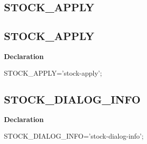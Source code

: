 \documentclass{report}
\newif\ifpdf
\begin{document}
\subsection*{\large{\textbf{STOCK{\_}APPLY}}\normalsize\hspace{1ex}\hrulefill}
\else
\subsection*{STOCK{\_}APPLY}
\fi
\label{licommon-STOCK_APPLY}
\begin{list}{}{
\setlength{\itemindent}{0cm}
\setlength{\listparindent}{0cm}
\setlength{\leftmargin}{\evensidemargin}
\addtolength{\leftmargin}{\tmplength}
\settowidth{\labelsep}{X}
\addtolength{\leftmargin}{\labelsep}
\setlength{\labelwidth}{\tmplength}
}
\item[\textbf{Declaration}\hfill]
\ifpdf
\begin{flushleft}
\fi
\begin{ttfamily}
STOCK{\_}APPLY='stock-apply';\end{ttfamily}

\ifpdf
\end{flushleft}
\fi

\end{list}
\ifpdf
\subsection*{\large{\textbf{STOCK{\_}DIALOG{\_}INFO}}\normalsize\hspace{1ex}\hrulefill}
\else
\subsection*{STOCK{\_}DIALOG{\_}INFO}
\fi
\label{licommon-STOCK_DIALOG_INFO}
\begin{list}{}{
\setlength{\itemindent}{0cm}
\setlength{\listparindent}{0cm}
\setlength{\leftmargin}{\evensidemargin}
\addtolength{\leftmargin}{\tmplength}
\settowidth{\labelsep}{X}
\addtolength{\leftmargin}{\labelsep}
\setlength{\labelwidth}{\tmplength}
}
\item[\textbf{Declaration}\hfill]
\ifpdf
\begin{flushleft}
\fi
\begin{ttfamily}
STOCK{\_}DIALOG{\_}INFO='stock-dialog-info';\end{ttfamily}

\ifpdf
\end{flushleft}
\fi

\end{list}
\ifpdf
\end{document}
